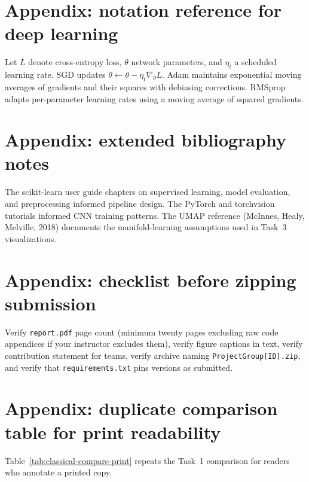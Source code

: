 \documentclass[11pt,a4paper]{article}
\begin{document}
\section{Appendix: notation reference for deep learning}
Let $L$ denote cross-entropy loss, $\theta$ network parameters, and $\eta_t$ a scheduled learning rate. SGD updates $\theta \leftarrow \theta - \eta_t \nabla_\theta L$. Adam maintains exponential moving averages of gradients and their squares with debiasing corrections. RMSprop adapts per-parameter learning rates using a moving average of squared gradients.

\section{Appendix: extended bibliography notes}
The scikit-learn user guide chapters on supervised learning, model evaluation, and preprocessing informed pipeline design. The PyTorch and torchvision tutorials informed CNN training patterns. The UMAP reference (McInnes, Healy, Melville, 2018) documents the manifold-learning assumptions used in Task~3 visualizations.

\section{Appendix: checklist before zipping submission}
Verify \texttt{report.pdf} page count (minimum twenty pages excluding raw code appendices if your instructor excludes them), verify figure captions in text, verify contribution statement for teams, verify archive naming \texttt{ProjectGroup[ID].zip}, and verify that \texttt{requirements.txt} pins versions as submitted.

\section{Appendix: duplicate comparison table for print readability}
Table~\ref{tab:classical-compare-print} repeats the Task~1 comparison for readers who annotate a printed copy.
\end{document}
